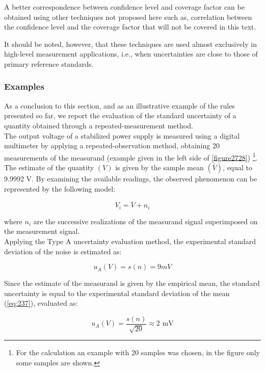 \documentclass[../main.tex]{subfiles}
\begin{document}
A better correspondence between confidence level and coverage factor can be obtained using other techniques not proposed here such as, correlation between the confidence level and the coverage factor that will not be covered in this text.

It should be noted, however, that these techniques are used almost exclusively in high-level measurement applications, i.e., when uncertainties are close to those of primary reference standards.

\subsubsection{Examples}

As a conclusion to this section, and as an illustrative example of the rules presented so far, we report the evaluation of the standard uncertainty of a quantity obtained through a repeated-measurement method.\\

The output voltage of a stabilized power supply is measured using a digital multimeter by applying a repeated-observation method, obtaining 20 measurements of the measurand (example given in the left side of \autoref{figure2728}) \footnote{For the calculation an example with 20 samples was chosen, in the figure only some samples are shown.}. The estimate of the quantity $(V)$ is given by the sample mean $(\overline{V})$, equal to 9.9992 V. By examining the available readings, the observed phenomenon can be represented by the following model:

\begin{equation}
	V_i = \overline{V} + n_i
\label{eq:251}	
\end{equation}

where $n_i$ are the successive realizations of the measurand signal superimposed on the measurement signal.\\

Applying the Type A uncertainty evaluation method, the experimental standard deviation of the noise is estimated as:

\begin{equation}
	u_A(V) = s(n) = 9 \unit{mV}
\end{equation}

Since the estimate of the measurand is given by the empirical mean, the standard uncertainty is equal to the experimental standard deviation of the mean (\autoref{eq:237}), evaluated as:

\begin{equation}
	u_A(V) = \frac{s(n)}{\sqrt{20}} \approx 2 \text{ mV} 
\end{equation}
\end{document}
